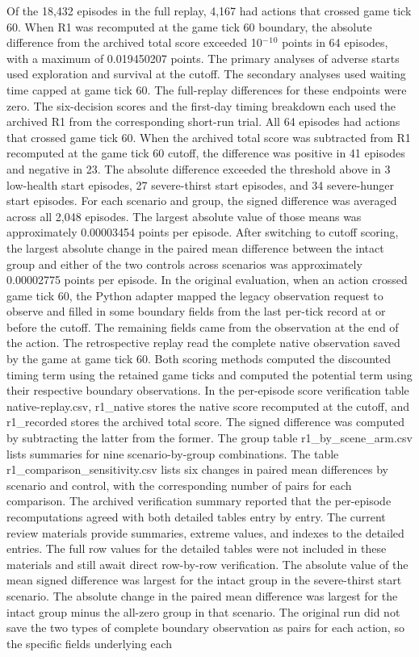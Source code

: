 \documentclass{article}
\begin{document}
Of the 18,432 episodes in the full replay, 4,167 had actions that crossed game tick 60. When R1 was recomputed at the game tick 60 boundary, the absolute difference from the archived total score exceeded 10\ensuremath{{}^{-}}\ensuremath{{}^{1}}\ensuremath{{}^{0}} points in 64 episodes, with a maximum of 0.019450207 points. The primary analyses of adverse starts used exploration and survival at the cutoff. The secondary analyses used waiting time capped at game tick 60. The full-replay differences for these endpoints were zero. The six-decision scores and the first-day timing breakdown each used the archived R1 from the corresponding short-run trial. All 64 episodes had actions that crossed game tick 60. When the archived total score was subtracted from R1 recomputed at the game tick 60 cutoff, the difference was positive in 41 episodes and negative in 23. The absolute difference exceeded the threshold above in 3 low-health start episodes, 27 severe-thirst start episodes, and 34 severe-hunger start episodes. For each scenario and group, the signed difference was averaged across all 2,048 episodes. The largest absolute value of those means was approximately 0.00003454 points per episode. After switching to cutoff scoring, the largest absolute change in the paired mean difference between the intact group and either of the two controls across scenarios was approximately 0.00002775 points per episode. In the original evaluation, when an action crossed game tick 60, the Python adapter mapped the legacy observation request to observe and filled in some boundary fields from the last per-tick record at or before the cutoff. The remaining fields came from the observation at the end of the action. The retrospective replay read the complete native observation saved by the game at game tick 60. Both scoring methods computed the discounted timing term using the retained game ticks and computed the potential term using their respective boundary observations. In the per-episode score verification table native-replay.csv, r1\_\allowbreak{}native stores the native score recomputed at the cutoff, and r1\_\allowbreak{}recorded stores the archived total score. The signed difference was computed by subtracting the latter from the former. The group table r1\_\allowbreak{}by\_\allowbreak{}scene\_\allowbreak{}arm.csv lists summaries for nine scenario-by-group combinations. The table r1\_\allowbreak{}comparison\_\allowbreak{}sensitivity.csv lists six changes in paired mean differences by scenario and control, with the corresponding number of pairs for each comparison. The archived verification summary reported that the per-episode recomputations agreed with both detailed tables entry by entry. The current review materials provide summaries, extreme values, and indexes to the detailed entries. The full row values for the detailed tables were not included in these materials and still await direct row-by-row verification. The absolute value of the mean signed difference was largest for the intact group in the severe-thirst start scenario. The absolute change in the paired mean difference was largest for the intact group minus the all-zero group in that scenario. The original run did not save the two types of complete boundary observation as pairs for each action, so the specific fields underlying each 
\end{document}
